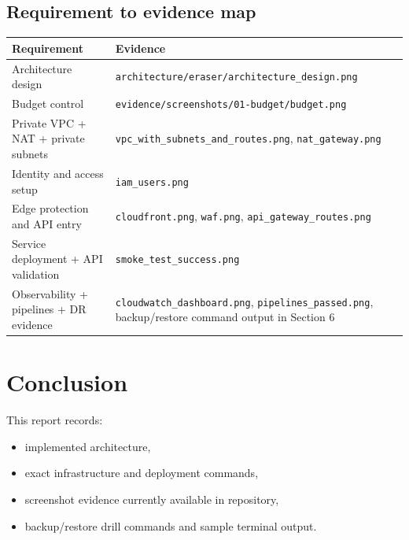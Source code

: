 \documentclass{article}
\begin{document}
\subsection{Requirement to evidence map}
\begin{center}
\begin{tabular}{|>{\raggedright\arraybackslash}p{}|>{\raggedright\arraybackslash}p{}|}
\hline
Requirement & Evidence \\
\hline
Architecture design & \texttt{architecture/eraser/architecture\_design.png} \\
\hline
Budget control & \texttt{evidence/screenshots/01-budget/budget.png} \\
\hline
Private VPC + NAT + private subnets & \texttt{vpc\_with\_subnets\_and\_routes.png}, \texttt{nat\_gateway.png} \\
\hline
Identity and access setup & \texttt{iam\_users.png} \\
\hline
Edge protection and API entry & \texttt{cloudfront.png}, \texttt{waf.png}, \texttt{api\_gateway\_routes.png} \\
\hline
Service deployment + API validation & \texttt{smoke\_test\_success.png} \\
\hline
Observability + pipelines + DR evidence & \texttt{cloudwatch\_dashboard.png}, \texttt{pipelines\_passed.png}, backup/restore command output in Section 6 \\
\hline
\end{tabular}
\end{center}

\section{Conclusion}
This report records:
\begin{itemize}
    \item implemented architecture,
    \item exact infrastructure and deployment commands,
    \item screenshot evidence currently available in repository,
    \item backup/restore drill commands and sample terminal output.
\end{itemize}
\end{document}
